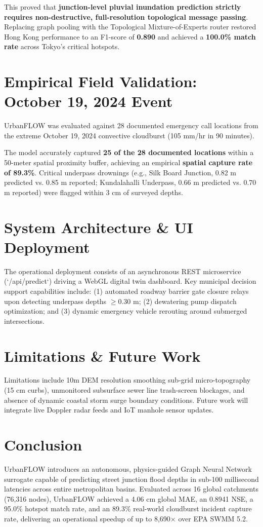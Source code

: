 \documentclass[conference]{IEEEtran}
\begin{document}
This proved that \textbf{junction-level pluvial inundation prediction strictly requires non-destructive, full-resolution topological message passing}. Replacing graph pooling with the Topological Mixture-of-Experts router restored Hong Kong performance to an F1-score of \textbf{0.890} and achieved a \textbf{100.0\% match rate} across Tokyo's critical hotspots.

\section{Empirical Field Validation: October 19, 2024 Event}

UrbanFLOW was evaluated against 28 documented emergency call locations from the extreme October 19, 2024 convective cloudburst (105 mm/hr in 90 minutes).

The model accurately captured \textbf{25 of the 28 documented locations} within a 50-meter spatial proximity buffer, achieving an empirical \textbf{spatial capture rate of 89.3\%}. Critical underpass drownings (e.g., Silk Board Junction, 0.82 m predicted vs. 0.85 m reported; Kundalahalli Underpass, 0.66 m predicted vs. 0.70 m reported) were flagged within 3 cm of surveyed depths.

\section{System Architecture \& UI Deployment}
The operational deployment consists of an asynchronous REST microservice (`/api/predict`) driving a WebGL digital twin dashboard. Key municipal decision support capabilities include: (1) automated roadway barrier gate closure relays upon detecting underpass depths $\ge 0.30\text{ m}$; (2) dewatering pump dispatch optimization; and (3) dynamic emergency vehicle rerouting around submerged intersections.

\section{Limitations \& Future Work}
Limitations include 10m DEM resolution smoothing sub-grid micro-topography (15 cm curbs), unmonitored subsurface sewer line trash-screen blockages, and absence of dynamic coastal storm surge boundary conditions. Future work will integrate live Doppler radar feeds and IoT manhole sensor updates.

\section{Conclusion}
UrbanFLOW introduces an autonomous, physics-guided Graph Neural Network surrogate capable of predicting street junction flood depths in sub-100 millisecond latencies across entire metropolitan basins. Evaluated across 16 global catchments (76,316 nodes), UrbanFLOW achieved a 4.06 cm global MAE, an 0.8941 NSE, a 95.0\% hotspot match rate, and an 89.3\% real-world cloudburst incident capture rate, delivering an operational speedup of up to 8,690$\times$ over EPA SWMM 5.2.
\end{document}
